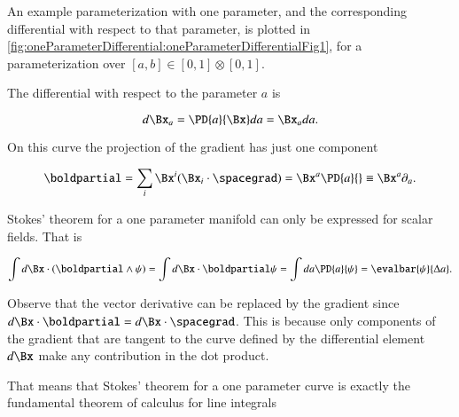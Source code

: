 %
%
An example parameterization with one parameter, and the corresponding differential with respect to that parameter, is plotted in
\cref{fig:oneParameterDifferential:oneParameterDifferentialFig1}, for a parameterization over \( [a, b] \in [0,1]\otimes[0,1] \).


The differential with respect to the parameter \( a \) is

\begin{equation}\label{eqn:oneparameter:20}
d\Bx_a = \PD{a}{\Bx} da = \Bx_a da.
\end{equation}

On this curve the projection of the gradient has just one component

\begin{dmath}\label{eqn:oneparameter:40}
\boldpartial
=
\sum_i \Bx^i (\Bx_i \cdot \spacegrad)
=
\Bx^a \PD{a}{}
\equiv
\Bx^a \partial_a.
\end{dmath}

Stokes' theorem for a one parameter manifold can only be expressed for scalar fields.
That is

\begin{dmath}\label{eqn:oneparameter:60}
\int d\Bx \cdot (\boldpartial \wedge \psi)
=
\int d\Bx \cdot \boldpartial \psi
=
\int da \PD{a}{ \psi }
= \evalbar{\psi}{\Delta a}.
\end{dmath}

Observe that the vector derivative can be replaced by the gradient since \( d\Bx \cdot \boldpartial = d\Bx \cdot \spacegrad \).
This is because only components of the gradient that are tangent to the curve defined by the differential element \( d\Bx \) make any contribution in the dot product.

That means that Stokes' theorem for a one parameter curve is exactly the fundamental theorem of calculus for line integrals

